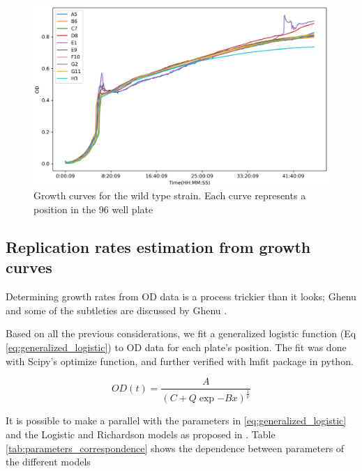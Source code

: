 \documentclass{article}
\begin{document}
\begin{figure}
    \centering
    \includegraphics[scale = 0.7]{plots/gc.png}
    \caption{Growth curves for the wild type strain. Each curve represents a position in the 96 well plate}
    \label{fig:gc_wt}
\end{figure}

\subsection{Replication rates estimation from growth curves}

Determining growth rates from OD data is a process trickier than it looks; Ghenu and  some of the subtleties are discussed by Ghenu \cite{ghenu_challenges_nodate, krishnamurthi_new_2021}. 

Based on all the previous considerations, we fit a generalized logistic function (Eq \ref{eq:generalized_logistic}) to OD data for each plate's position. The fit was done with Scipy's optimize function, and further verified with lmfit package in python. 

\begin{equation}
    OD(t) = \frac{A}{\left(C + Q\exp{-Bx}\right)^\frac{1}{\nu}}
    \label{eq:generalized_logistic}
\end{equation}

It is possible to make a parallel with the parameters in \ref{eq:generalized_logistic} and the Logistic and Richardson models as proposed in \cite{ghenu_challenges_nodate}. Table \ref{tab:parameters_correspondence} shows the dependence between parameters of the different models 
\end{document}
